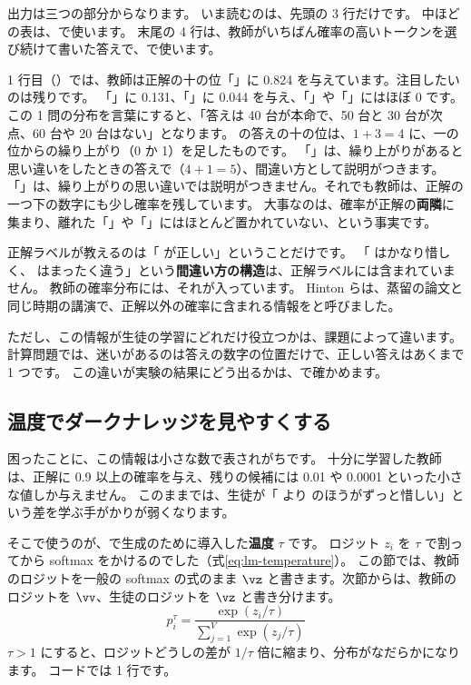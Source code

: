 
出力は三つの部分からなります。
いま読むのは、先頭の 3 行だけです。
中ほどの表は、で使います。
末尾の 4 行は、教師がいちばん確率の高いトークンを選び続けて書いた答えで、で使います。

1 行目（）では、教師は正解の十の位「」に 0.824 を与えています。注目したいのは残りです。
「」に 0.131、「」に 0.044 を与え、「」や「」にはほぼ 0 です。
この 1 問の分布を言葉にすると、「答えは 40 台が本命で、50 台と 30 台が次点、60 台や 20 台はない」となります。
 の答えの十の位は、$1+3=4$ に、一の位からの繰り上がり（0 か 1）を足したものです。
「」は、繰り上がりがあると思い違いをしたときの答えで（$4+1=5$）、間違い方として説明がつきます。
「」は、繰り上がりの思い違いでは説明がつきません。それでも教師は、正解の一つ下の数字にも少し確率を残しています。
大事なのは、確率が正解の\textbf{両隣}に集まり、離れた「」や「」にはほとんど置かれていない、という事実です。

正解ラベルが教えるのは「 が正しい」ということだけです。
「 はかなり惜しく、 はまったく違う」という\textbf{間違い方の構造}は、正解ラベルには含まれていません。
教師の確率分布には、それが入っています。
Hinton らは、蒸留の論文\cite{hinton2015distilling}と同じ時期の講演で、正解以外の確率に含まれる情報をと呼びました。

ただし、この情報が生徒の学習にどれだけ役立つかは、課題によって違います。
計算問題では、迷いがあるのは答えの数字の位置だけで、正しい答えはあくまで 1 つです。
この違いが実験の結果にどう出るかは、で確かめます。


\subsection{温度でダークナレッジを見やすくする}

困ったことに、この情報は小さな数で表されがちです。
十分に学習した教師は、正解に 0.9 以上の確率を与え、残りの候補には 0.01 や 0.0001 といった小さな値しか与えません。
このままでは、生徒が「 より  のほうがずっと惜しい」という差を学ぶ手がかりが弱くなります。

そこで使うのが、で生成のために導入した\textbf{温度} $\tau$ です。
ロジット $z_i$ を $\tau$ で割ってから softmax をかけるのでした（式\eqref{eq:lm-temperature}）。
この節では、教師のロジットを一般の softmax の式のまま $\vz$ と書きます。次節からは、教師のロジットを $\vv$、生徒のロジットを $\vz$ と書き分けます。
\begin{equation}
p^{\tau}_i=\frac{\exp(z_i/\tau)}{\sum_{j=1}^{V}\exp(z_j/\tau)}
\label{eq:distill-softmax-tau}
\end{equation}
$\tau>1$ にすると、ロジットどうしの差が $1/\tau$ 倍に縮まり、分布がなだらかになります。
コードでは 1 行です。

